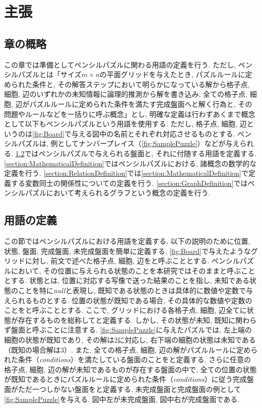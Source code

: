 \chapter{主張}\label{chapter:Prepare}
\section{章の概略}\label{section:Outline}
この章では準備としてペンシルパズルに関わる用語の定義を行う. ただし, ペンシルパズルとは「サイズ$m\times n$の平面グリッドを与えたとき, パズルルールに定められた条件と, その解答ステップにおいて明らかになっている解から格子点, 細胞, 辺のいずれかの未知情報に論理的推測から解を書き込み, 全ての格子点, 細胞, 辺がパズルルールに定められた条件を満たす完成盤面へと解く行為と, その問題やルールなどを一括りに呼ぶ概念」とし, 明確な定義は行わずあくまで概念として以下もペンシルパズルという用語を使用する. ただし, 格子点, 細胞, 辺というのは\cref{fig:Board}で与える図中の名前とそれぞれ対応させるものとする.
ペンシルパズルは, 例としてナンバープレイス（\cref{fig:SamplePuzzle}）などが与えられる.
\cref{section:WordDefinition}ではペンシルパズルで与えられる盤面と, それに付随する用語を定義する.
\cref{section:MathematicalDefinition}ではペンシルパズルにおける, 諸概念の数学的な定義を行う.
\cref{section:RelationDefinition}では\cref{section:MathematicalDefinition}で定義する変数同士の関係性についての定義を行う.
\cref{section:GraphDefinition}ではペンシルパズルにおいて考えられるグラフという概念の定義を行う.

\section{用語の定義}\label{section:WordDefinition}
この節ではペンシルパズルにおける用語を定義する.
以下の説明のために位置, 状態, 盤面, 完成盤面, 未完成盤面を簡単に定義する. \cref{fig:Board}で与えたようなグリッドに対し, 前文で述べた格子点, 細胞, 辺をと呼ぶこととする. ペンシルパズルにおいて, その位置に与えられる状態のことを本研究ではそのままと呼ぶこととする. 状態とは, 位置に対応する写像で送った結果のことを指し, 未知である状態のことを特に\textit{null}と表現し, 既知である状態のときは具体的に数値や定数で与えられるものとする. 位置の状態が既知である場合, その具体的な数値や定数のことをと呼ぶこととする. ここで, グリッドにおける各格子点, 細胞, 辺全てに状態が存在するものを総称してと定義する. しかし, その状態が未知, 既知に関わらず盤面と呼ぶことに注意する. \cref{fig:SamplePuzzle}に与えたパズルでは, 左上端の細胞の状態が既知であり, その解は2に対応し, 右下端の細胞の状態は未知である（既知の場合解は3）.
また, 全ての格子点, 細胞, 辺の解がパズルルールに定められた条件（\textit{conditions}）を満たしている盤面のことをと定義する. さらに任意の格子点, 細胞, 辺の解が未知であるものが存在する盤面の中で, 全ての位置の状態が既知であるときにパズルルールに定められた条件（\textit{conditions}）に従う完成盤面がただ一つしかない盤面をと定義する. 未完成盤面と完成盤面の例として\cref{fig:SamplePuzzle}を与える. 図中左が未完成盤面, 図中右が完成盤面である.

